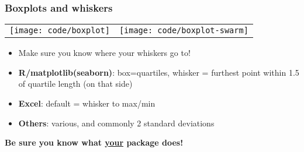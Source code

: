 \documentclass{beamer}
\newcommand{\key}[1]{\textcolor{keyred}{{\bf #1}}}
\begin{document}
\begin{frame}
\frametitle{Boxplots and whiskers}
\begin{tabular}{@{}cc}
\begin{minipage}{0.5\textwidth}
\texttt{[image: code/boxplot]}
\end{minipage}&
\begin{minipage}{0.5\textwidth}
\texttt{[image: code/boxplot-swarm]}
\end{minipage}
\end{tabular}
\begin{itemize}
\item Make sure you know where your whiskers go to!
\item
\key{R/matplotlib(seaborn)}: box=quartiles, whisker = furthest point within 1.5 of quartile length (on that side)  \pause
\item
\key{Excel}: default = whisker to max/min \pause
\item
\key{Others}: various, and commonly 2 standard deviations
%
\end{itemize}
\begin{center}
\key{Be sure you know what \underline{your} package does!}
\end{center}
\end{frame}

\end{document}
